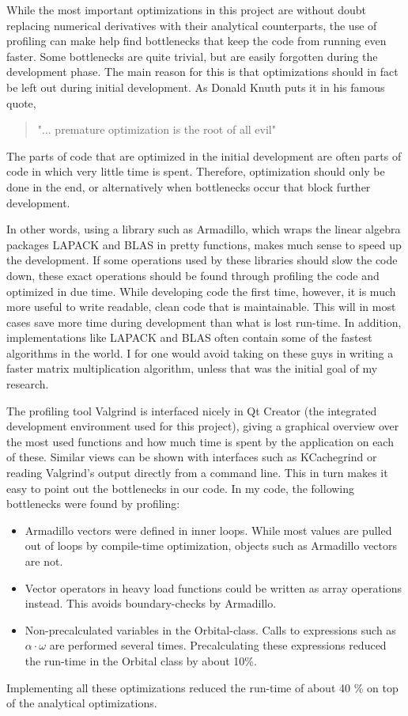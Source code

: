 \documentclass[aps,prb,twocolumn,floatfix]{revtex4}
\begin{document}
While the most important optimizations in this project are without doubt replacing numerical derivatives with their analytical counterparts, the use of profiling can make help find bottlenecks that keep the code from running even faster. Some bottlenecks are quite trivial, but are easily forgotten during the development phase. The main reason for this is that optimizations should in fact be left out during initial development. As Donald Knuth puts it in his famous quote,
\begin{quote}
"... premature optimization is the root of all evil" 
\end{quote}
The parts of code that are optimized in the initial development are often parts of code in which very little time is spent. Therefore, optimization should only be done in the end, or alternatively when bottlenecks occur that block further development.

In other words, using a library such as Armadillo, which wraps the linear algebra packages LAPACK and BLAS in pretty functions,
makes much sense to speed up the development. If some operations used by these libraries should slow the code down, these exact operations should be found through profiling the code and optimized in due time. While developing code the first time, however, it is much more useful to write readable, clean code that is maintainable. This will in most cases save more time during development than what is lost run-time. In addition, implementations like LAPACK and BLAS often contain some of the fastest algorithms in the world. I for one would avoid taking on these guys in writing a faster matrix multiplication algorithm, unless that was the initial goal of my research.

The profiling tool Valgrind is interfaced nicely in Qt Creator (the integrated development environment used for this project), giving a graphical overview over the most used functions and how much time is spent by the application on each of these.
 Similar views can be shown with interfaces such as KCachegrind or reading Valgrind's output directly from a command line.
This in turn makes it easy to point out the bottlenecks in our code. In my code, the following bottlenecks were found by profiling:
\begin{itemize}
        \item Armadillo vectors were defined in inner loops. While most values are pulled out of loops by compile-time optimization, objects such as Armadillo vectors are not.
        \item Vector operators in heavy load functions could be written as array operations instead. This avoids boundary-checks by Armadillo.
        \item Non-precalculated variables in the Orbital-class. Calls to expressions such as $\alpha \cdot \omega$ are performed several times. Precalculating these expressions reduced the run-time in the Orbital class by about 10\%.
\end{itemize}
Implementing all these optimizations reduced the run-time of about 40 \% on top of the analytical optimizations.
\end{document}
